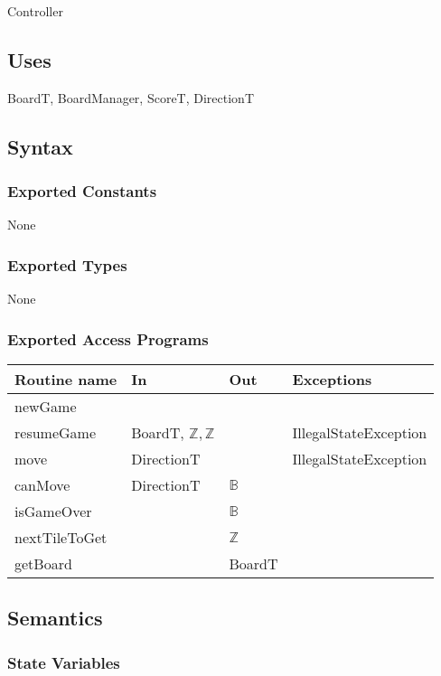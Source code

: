 \documentclass[12pt]{article}
\begin{document}
Controller

\subsection* {Uses}

BoardT, BoardManager, ScoreT, DirectionT

\subsection* {Syntax}

\subsubsection* {Exported Constants}

None

\subsubsection* {Exported Types}

None

\subsubsection* {Exported Access Programs}

\begin{tabular}{| l | l | l | p{6cm} |}
\hline
\textbf{Routine name} & \textbf{In} & \textbf{Out} & \textbf{Exceptions}\\
\hline
newGame &  &  & \\
\hline
resumeGame & BoardT, $\mathbb{Z}, \mathbb{Z}$&  & IllegalStateException \\
\hline
move & DirectionT  &  & IllegalStateException \\
\hline
canMove & DirectionT  &  $\mathbb{B} $&  \\
\hline
isGameOver &  & $\mathbb{B}$ & \\
\hline
nextTileToGet &  & $\mathbb{Z}$ & \\
\hline
getBoard &  &  BoardT & \\
\hline

\end{tabular}

\subsection* {Semantics}

\subsubsection* {State Variables}
\end{document}
